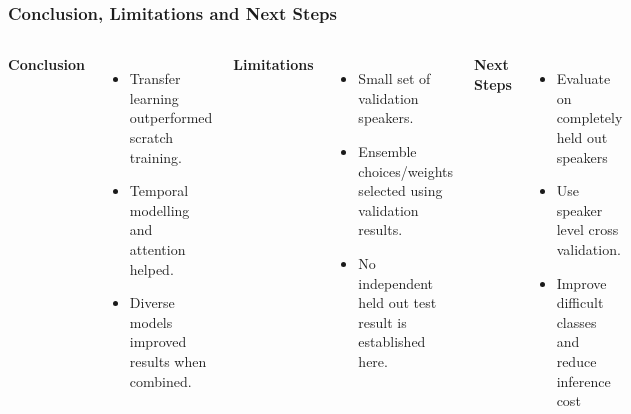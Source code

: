 \documentclass[aspectratio=169, 10pt]{beamer}
\begin{document}
\begin{frame}
\frametitle{Conclusion, Limitations and Next Steps}

\vspace{-0.25cm}
\begin{columns}[onlytextwidth, T]
    {\fontsize{11}{14}\selectfont\textbf{\color{themeblue}Conclusion}}\\[0.15cm]
    {\fontsize{8}{11.5}\selectfont
    \begin{itemize}
      \item Transfer learning outperformed scratch training.
      \item Temporal modelling and attention helped.
      \item Diverse models improved results when combined.
    \end{itemize}}

    \hspace{-0.15cm}\vline\hspace{0.15cm}
    \begin{minipage}{0.92\linewidth}
    {\fontsize{11}{14}\selectfont\textbf{\color{themeblue}Limitations}}\\[0.15cm]
    {\fontsize{8}{11.5}\selectfont
    \begin{itemize}
      \item Small set of validation speakers\cite{lyngdoh2026}.
      \item Ensemble choices/weights selected using validation results.
      \item No independent held out test result is established here.
    \end{itemize}}
    \end{minipage}

    \hspace{-0.15cm}\vline\hspace{0.15cm}
    \begin{minipage}{0.92\linewidth}
    {\fontsize{11}{14}\selectfont\textbf{\color{themeblue}Next Steps}}\\[0.15cm]
    {\fontsize{8}{11.5}\selectfont
    \begin{itemize}
      \item Evaluate on completely held out speakers
      \item Use speaker level cross validation\cite{lyngdoh2026}.
      \item Improve difficult classes and reduce inference cost
    \end{itemize}}
    \end{minipage}
\end{columns}


\end{frame}
\end{document}

